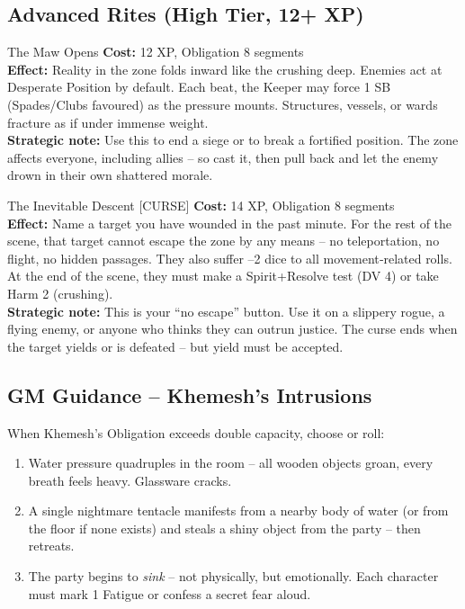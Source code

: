 \documentclass[10pt,a5paper]{book}
\begin{document}
\subsection*{Advanced Rites (High Tier, 12+ XP)}

\begin{patronbox}{The Maw Opens}
\textbf{Cost:} 12 XP, Obligation 8 segments \\
\textbf{Effect:} Reality in the zone folds inward like the crushing deep. Enemies act at Desperate Position by default. Each beat, the Keeper may force 1 SB (Spades/Clubs favoured) as the pressure mounts. Structures, vessels, or wards fracture as if under immense weight. \\
\textbf{Strategic note:} Use this to end a siege or to break a fortified position. The zone affects everyone, including allies – so cast it, then pull back and let the enemy drown in their own shattered morale.
\end{patronbox}

\begin{patronbox}{The Inevitable Descent [CURSE]}
\textbf{Cost:} 14 XP, Obligation 8 segments \\
\textbf{Effect:} Name a target you have wounded in the past minute. For the rest of the scene, that target cannot escape the zone by any means – no teleportation, no flight, no hidden passages. They also suffer –2 dice to all movement‑related rolls. At the end of the scene, they must make a Spirit+Resolve test (DV 4) or take Harm 2 (crushing). \\
\textbf{Strategic note:} This is your “no escape” button. Use it on a slippery rogue, a flying enemy, or anyone who thinks they can outrun justice. The curse ends when the target yields or is defeated – but yield must be accepted.
\end{patronbox}

\subsection*{GM Guidance – Khemesh’s Intrusions}

When Khemesh’s Obligation exceeds double capacity, choose or roll:
\begin{enumerate}
    \item Water pressure quadruples in the room – all wooden objects groan, every breath feels heavy. Glassware cracks.
    \item A single nightmare tentacle manifests from a nearby body of water (or from the floor if none exists) and steals a shiny object from the party – then retreats.
    \item The party begins to \textit{sink} – not physically, but emotionally. Each character must mark 1 Fatigue or confess a secret fear aloud.
\end{enumerate}
\end{document}
